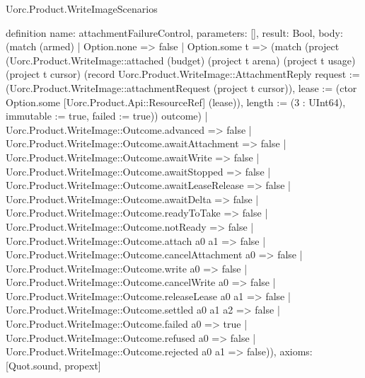 \begin{lexlean}{Uorc.Product.WriteImageScenarios}
\begin{semanticmodule}
definition{
  name: attachmentFailureControl,
  parameters: [],
  result: Bool,
  body: (match (armed)
    | Option.none => false
    | Option.some t => (match (project (Uorc.Product.WriteImage::attached (budget) (project t arena) (project t usage) (project t cursor) (record Uorc.Product.WriteImage::AttachmentReply {request := (Uorc.Product.WriteImage::attachmentRequest (project t cursor)), lease := (ctor Option.some [Uorc.Product.Api::ResourceRef] (lease)), length := (3 : UInt64), immutable := true, failed := true})) outcome)
      | Uorc.Product.WriteImage::Outcome.advanced => false
      | Uorc.Product.WriteImage::Outcome.awaitAttachment => false
      | Uorc.Product.WriteImage::Outcome.awaitWrite => false
      | Uorc.Product.WriteImage::Outcome.awaitStopped => false
      | Uorc.Product.WriteImage::Outcome.awaitLeaseRelease => false
      | Uorc.Product.WriteImage::Outcome.awaitDelta => false
      | Uorc.Product.WriteImage::Outcome.readyToTake => false
      | Uorc.Product.WriteImage::Outcome.notReady => false
      | Uorc.Product.WriteImage::Outcome.attach a0 a1 => false
      | Uorc.Product.WriteImage::Outcome.cancelAttachment a0 => false
      | Uorc.Product.WriteImage::Outcome.write a0 => false
      | Uorc.Product.WriteImage::Outcome.cancelWrite a0 => false
      | Uorc.Product.WriteImage::Outcome.releaseLease a0 a1 => false
      | Uorc.Product.WriteImage::Outcome.settled a0 a1 a2 => false
      | Uorc.Product.WriteImage::Outcome.failed a0 => true
      | Uorc.Product.WriteImage::Outcome.refused a0 => false
      | Uorc.Product.WriteImage::Outcome.rejected a0 a1 => false)),
  axioms: [Quot.sound, propext]
}


\end{semanticmodule}
\end{lexlean}
